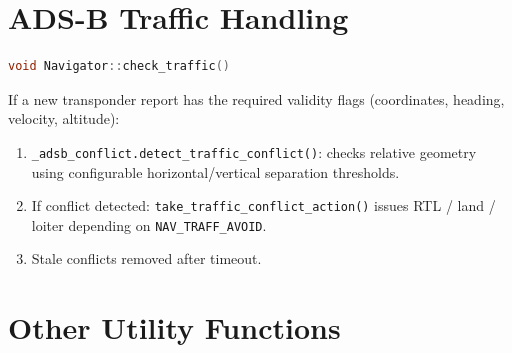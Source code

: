\documentclass[12pt,a4paper]{article}
\begin{document}
\section{ADS-B Traffic Handling}

\begin{lstlisting}[language=C++]
void Navigator::check_traffic()
\end{lstlisting}

If a new transponder report has the required validity flags
(coordinates, heading, velocity, altitude):
\begin{enumerate}
  \item \texttt{\_adsb\_conflict.detect\_traffic\_conflict()}: checks relative
        geometry using configurable horizontal/vertical separation thresholds.
  \item If conflict detected: \texttt{take\_traffic\_conflict\_action()} issues
        RTL / land / loiter depending on \texttt{NAV\_TRAFF\_AVOID}.
  \item Stale conflicts removed after timeout.
\end{enumerate}

\section{Other Utility Functions}
\end{document}
